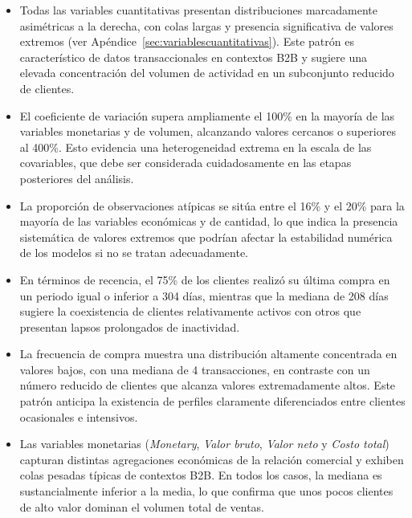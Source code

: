     \begin{itemize}
    \item Todas las variables cuantitativas presentan distribuciones marcadamente asimétricas a la derecha, con colas largas y presencia significativa de valores extremos (ver Apéndice~\ref{sec:variablescuantitativas}). Este patrón es característico de datos transaccionales en contextos B2B y sugiere una elevada concentración del volumen de actividad en un subconjunto reducido de clientes.
    
    \item El coeficiente de variación supera ampliamente el 100\% en la mayoría de las variables monetarias y de volumen, alcanzando valores cercanos o superiores al 400\%. Esto evidencia una heterogeneidad extrema en la escala de las covariables, que debe ser considerada cuidadosamente en las etapas posteriores del análisis.
    
    \item La proporción de observaciones atípicas se sitúa entre el 16\% y el 20\% para la mayoría de las variables económicas y de cantidad, lo que indica la presencia sistemática de valores extremos que podrían afectar la estabilidad numérica de los modelos si no se tratan adecuadamente.
    
    \item En términos de recencia, el 75\% de los clientes realizó su última compra en un periodo igual o inferior a 304 días, mientras que la mediana de 208 días sugiere la coexistencia de clientes relativamente activos con otros que presentan lapsos prolongados de inactividad.
    
    \item La frecuencia de compra muestra una distribución altamente concentrada en valores bajos, con una mediana de 4 transacciones, en contraste con un número reducido de clientes que alcanza valores extremadamente altos. Este patrón anticipa la existencia de perfiles claramente diferenciados entre clientes ocasionales e intensivos.
    
    \item Las variables monetarias (\textit{Monetary}, \textit{Valor bruto}, \textit{Valor neto} y \textit{Costo total}) capturan distintas agregaciones económicas de la relación comercial y exhiben colas pesadas típicas de contextos B2B. En todos los casos, la mediana es sustancialmente inferior a la media, lo que confirma que unos pocos clientes de alto valor dominan el volumen total de ventas.
    

\end{itemize}
